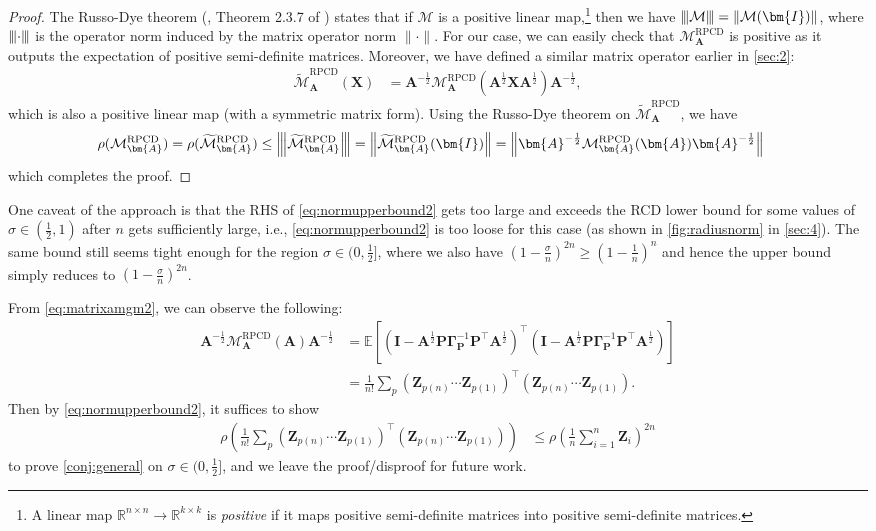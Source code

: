 \documentclass{article}
\theoremstyle{plain}
\theoremstyle{definition}
\theoremstyle{remark}
\def\norm#1{\lVert#1\rVert}
\def\bignorm#1{\left\lVert#1\right\rVert}
\def\bigopen#1{\left(#1\right)}
\def\bigclosed#1{\left[#1\right]}
\newcommand{\vertiii}[1]{{\left\vert\kern-0.25ex\left\vert\kern-0.25ex\left\vert #1 
    \right\vert\kern-0.25ex\right\vert\kern-0.25ex\right\vert}}
\newcommand{\mGamma}{\bm{\Gamma}}
\newcommand{\RPCD}{\text{RPCD}} %
\newcommand{\MARPCD}{\mathcal{M}_{\bm{A}}^{\RPCD}} %
\def\mA{{\bm{A}}}
\def\mI{{\bm{I}}}
\def\mP{{\bm{P}}}
\def\mX{{\bm{X}}}
\def\mZ{{\bm{Z}}}
\def\gM{{\mathcal{M}}}
\newcommand{\E}{\mathbb{E}}
\newcommand{\R}{\mathbb{R}}
\begin{document}
\begin{proof}
    The Russo-Dye theorem (\citet{russodye}, Theorem 2.3.7 of \citet{bhatia07}) states that if $\gM$ is a positive linear map,\footnote{A linear map $\R^{n \times n} \rightarrow \R^{k \times k}$ is \emph{positive} if it maps positive semi-definite matrices into positive semi-definite matrices.} then we have $\vertiii{\gM} = \norm{\gM(\mI)}$, where $\vertiii{\cdot}$ is the operator norm induced by the matrix operator norm $\norm{\cdot}$.
    For our case, we can easily check that $\MARPCD$ is positive as it outputs the expectation of positive semi-definite matrices.
    Moreover, we have defined a similar matrix operator earlier in \cref{sec:2}:
    \begin{align*}
        \widetilde{\gM}_{\mA}^{\RPCD} (\mX) &= \mA^{-\frac12} \gM_{\mA}^{\RPCD} (\mA^{\frac12} \mX \mA^{\frac12}) \mA^{-\frac12},
    \end{align*}
    which is also a positive linear map (with a symmetric matrix form).
    Using the Russo-Dye theorem on $\widetilde{\gM}_{\mA}^{\RPCD}$, we have
    \begin{align*}
        \rho (\gM_{\mA}^{\RPCD}) &= \rho (\widetilde{\gM}_{\mA}^{\RPCD}) \le \vertiii{\widetilde{\gM}_{\mA}^{\RPCD}} = \bignorm{\widetilde{\gM}_{\mA}^{\RPCD} (\mI)} = \bignorm{\mA^{-\frac12} \gM_{\mA}^{\RPCD} (\mA) \mA^{-\frac12}}
    \end{align*}
    which completes the proof.
\end{proof}

One caveat of the approach is that the RHS of \eqref{eq:normupperbound2} gets too large and exceeds the RCD lower bound for some values of $\sigma \in (\frac12, 1)$ after $n$ gets sufficiently large, i.e., \eqref{eq:normupperbound2} is too loose for this case (as shown in \cref{fig:radiusnorm} in \cref{sec:4}).
The same bound still seems tight enough for the region $\sigma \in (0, \frac{1}{2}]$, where we also have $(1 - \frac{\sigma}{n})^{2n} \ge (1 - \frac{1}{n})^{n}$ and hence the upper bound simply reduces to $(1 - \frac{\sigma}{n})^{2n}$.

From \eqref{eq:matrixamgm2}, we can observe the following:
\begin{align*}
    \mA^{-\frac12} \gM_{\mA}^{\RPCD} (\mA) \mA^{-\frac12} &= \E \bigclosed{(\mI - \mA^{\frac12} \mP \mGamma_{\mP}^{-1} \mP^{\top} \mA^{\frac12})^{\top} (\mI - \mA^{\frac12} \mP \mGamma_{\mP}^{-1} \mP^{\top} \mA^{\frac12})} \\
    &= \frac{1}{n!} \sum_{p} (\mZ_{p(n)} \cdots \mZ_{p(1)})^{\top} (\mZ_{p(n)} \cdots \mZ_{p(1)}).
\end{align*}
Then by \eqref{eq:normupperbound2}, it suffices to show 
\begin{align*}
    \rho \bigopen{\frac{1}{n!} \sum_{p} (\mZ_{p(n)} \cdots \mZ_{p(1)})^{\top} (\mZ_{p(n)} \cdots \mZ_{p(1)})} &\le \rho \bigopen{\frac{1}{n} \sum_{i=1}^{n} \mZ_{i}}^{2n}
\end{align*}
to prove \cref{conj:general} on $\sigma \in (0, \frac{1}{2}]$, and we leave the proof/disproof for future work.
\newpage
\end{document}
